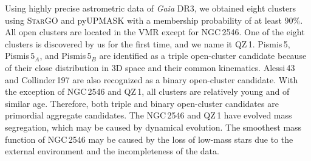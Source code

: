 \documentclass{aa} %
\begin{document}
Using highly precise astrometric data of {\it Gaia} DR3, we obtained eight clusters using \textsc{StarGO} and pyUPMASK with a membership 
probability of at least 90$\%$. All open clusters are located
in the VMR except for NGC\,2546. One of the eight clusters is
discovered by us for the first time, and we name it QZ\,1.
Pismis\,5, Pismis$\,5_{A}$, and Pismis$\,5_{B}$ are identified as a triple open-cluster candidate because of their 
close distribution in 3D space and their common kinematics. Alessi\,43 and 
Collinder\,197 are also recognized as a binary open-cluster candidate. With the exception of NGC\,2546 and QZ\,1,
all clusters are relatively young and of similar age. 
Therefore, both triple and binary open-cluster candidates are primordial aggregate candidates.
The NGC\,2546 and QZ\,1 have evolved mass segregation, which may be caused by dynamical evolution.
The smoothest mass function of NGC\,2546 may be caused by the loss of low-mass stars due to the 
external environment and the incompleteness of the data.
\end{document}
